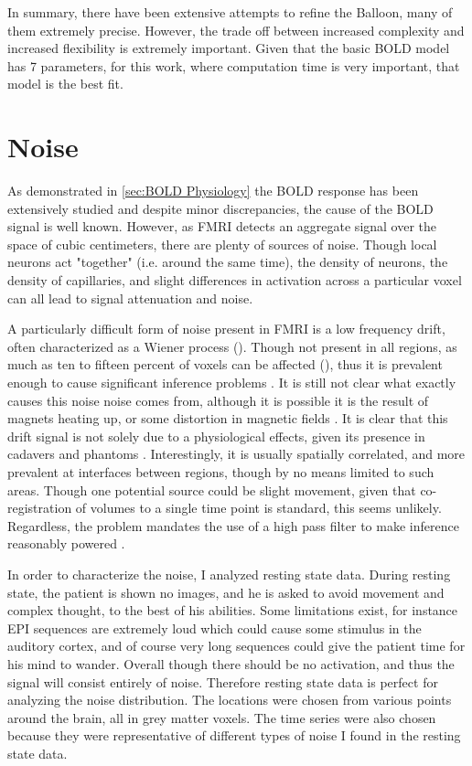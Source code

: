 In summary, there have been extensive attempts to refine the Balloon,
many of them extremely precise. However, the trade off 
between increased complexity and increased flexibility is extremely 
important. Given that the basic BOLD model has 7 parameters, for this
work, where computation time is very important, that model is
the best fit.

\section{Noise}
\label{sec:Introduction Noise}
As demonstrated in \autoref{sec:BOLD Physiology} the BOLD response has been
extensively studied and despite minor discrepancies, the cause of the BOLD 
signal is well known. However, as FMRI detects an  
aggregate signal over the space of cubic centimeters, there are
plenty of sources of noise. Though local neurons act
"together" (i.e. around the same time), the density of neurons, the
density of capillaries, and slight differences in activation across 
a particular voxel can all lead to signal attenuation and noise. 

A particularly difficult form of noise present in FMRI is a low frequency
drift, often characterized as a Wiener process (\cite{Riera2004}). 
Though not present in all regions, as much as ten to fifteen percent
of voxels can be affected (\cite{Tanabe2002}), thus it is prevalent enough to cause significant
inference problems \cite{Smith2007}. It is still not
clear what exactly causes this noise noise comes from, although it is possible it is 
the result of magnets heating up, or some distortion in magnetic
fields \cite{Smith2007}. It is clear that this drift signal is not solely
due to a physiological effects, given its presence in cadavers and phantoms 
\cite{Smith1999}. Interestingly, it is usually spatially correlated, and
more prevalent at interfaces between regions, though 
by no means limited to such areas. Though one potential source
could be slight movement, given that co-registration of volumes to a single time
point is standard, this seems unlikely. Regardless, the problem mandates
the use of a high pass filter to make inference reasonably powered
\cite{Smith2007}.

In order to characterize the noise, I analyzed resting state data.
During resting state, the patient is shown no images, and he is asked
to avoid movement and complex thought, to the best of his abilities.
Some limitations exist, for instance EPI sequences are extremely loud
which could cause some stimulus in the auditory cortex, and of course
very long sequences could give the patient time for his mind to wander.
Overall though there should be no activation, and thus the signal will
consist entirely of noise. Therefore resting state data is perfect
for analyzing the noise distribution. The locations were chosen from
various points around the brain, all in grey matter voxels. The time
series were also chosen because they were representative of different types
of noise I found in the resting state data.


